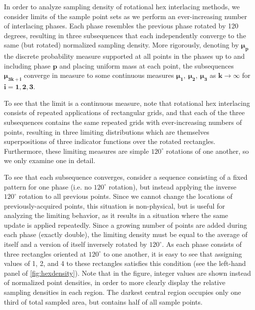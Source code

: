 \documentclass[aip, amsmath, amssymb, nobibnotes, nofootinbib, citeautoscript, reprint, superscriptaddress]{revtex4-1}
\begin{document}
    In order to analyze sampling density of rotational hex interlacing methods, we consider limits of the sample point sets as we perform an ever-increasing number of interlacing phases.
    Each phase resembles the previous phase rotated by 120 degrees, resulting in three subsequences that each independently converge to the same (but rotated) normalized sampling density.
    More rigorously, denoting by $\mathbf{\mu_p}$ the discrete probability measure supported at all points in the phases up to and including phase $\mathbf{p}$ and placing uniform mass at each point, the subsequences $\mathbf{\mu_{3k+i}}$ converge in measure to some continuous measures $\mathbf{\mu_1,\ \mu_2,\ \mu_3}$ as $\mathbf{k\to\infty}$ for $\mathbf{i=1,2,3}$.


    To see that the limit is a continuous measure, note that rotational hex interlacing consists of repeated applications of rectangular grids, and that each of the three subsequences contains the same repeated grids with ever-increasing numbers of points, resulting in three limiting distributions which are themselves superpositions of three indicator functions over the rotated rectangles.
    Furthermore, these limiting measures are simple $\mathrm{120^{\circ}}$ rotations of one another, so we only examine one in detail.


    To see that each subsequence converges, consider a sequence consisting of a fixed pattern for one phase (i.e. no $\mathrm{120^{\circ}}$ rotation), but instead applying the inverse $\mathrm{120^{\circ}}$ rotation to all previous points.
    Since we cannot change the locations of previously-acquired points, this situation is non-physical, but is useful for analyzing the limiting behavior, as it results in a situation where the same update is applied repeatedly.
    Since a growing number of points are added during each phase (exactly double), the limiting density must be equal to the average of itself and a version of itself inversely rotated by $\mathrm{120^{\circ}}$.
    As each phase consists of three rectangles oriented at $\mathrm{120^{\circ}}$ to one another, it is easy to see that assigning values of 1, 2, and 4 to these rectangles satisfies this condition (see the left-hand panel of \autoref{fig:hexdensity}).
    Note that in the figure, integer values are shown instead of normalized point densities, in order to more clearly display the relative sampling densities in each region.
    The darkest central region occupies only one third of total sampled area, but contains half of all sample points.
\end{document}
